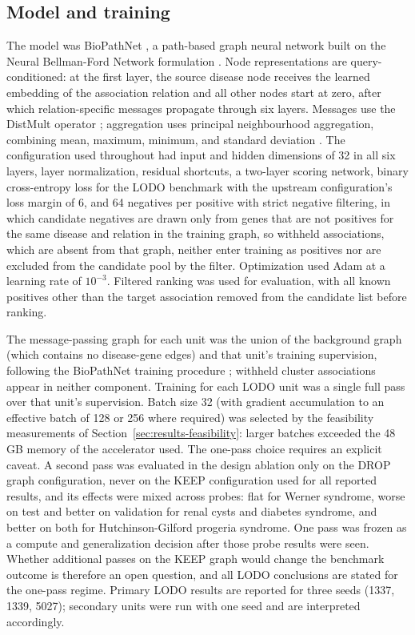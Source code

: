 \documentclass[11pt]{article}
\begin{document}
\subsection{Model and training}

The model was BioPathNet \cite{hu2026}, a path-based graph neural network built on the Neural Bellman-Ford Network formulation \cite{zhu2021}. Node representations are query-conditioned: at the first layer, the source disease node receives the learned embedding of the association relation and all other nodes start at zero, after which relation-specific messages propagate through six layers. Messages use the DistMult operator \cite{yang2015}; aggregation uses principal neighbourhood aggregation, combining mean, maximum, minimum, and standard deviation \cite{corso2020}. The configuration used throughout had input and hidden dimensions of 32 in all six layers, layer normalization, residual shortcuts, a two-layer scoring network, binary cross-entropy loss for the LODO benchmark with the upstream configuration's loss margin of 6, and 64 negatives per positive with strict negative filtering, in which candidate negatives are drawn only from genes that are not positives for the same disease and relation in the training graph, so withheld associations, which are absent from that graph, neither enter training as positives nor are excluded from the candidate pool by the filter. Optimization used Adam \cite{kingma2015} at a learning rate of $10^{-3}$. Filtered ranking was used for evaluation, with all known positives other than the target association removed from the candidate list before ranking.

The message-passing graph for each unit was the union of the background graph (which contains no disease-gene edges) and that unit's training supervision, following the BioPathNet training procedure \cite{hu2026}; withheld cluster associations appear in neither component. Training for each LODO unit was a single full pass over that unit's supervision. Batch size 32 (with gradient accumulation to an effective batch of 128 or 256 where required) was selected by the feasibility measurements of Section~\ref{sec:results-feasibility}: larger batches exceeded the 48 GB memory of the accelerator used. The one-pass choice requires an explicit caveat. A second pass was evaluated in the design ablation only on the DROP graph configuration, never on the KEEP configuration used for all reported results, and its effects were mixed across probes: flat for Werner syndrome, worse on test and better on validation for renal cysts and diabetes syndrome, and better on both for Hutchinson-Gilford progeria syndrome. One pass was frozen as a compute and generalization decision after those probe results were seen. Whether additional passes on the KEEP graph would change the benchmark outcome is therefore an open question, and all LODO conclusions are stated for the one-pass regime. Primary LODO results are reported for three seeds (1337, 1339, 5027); secondary units were run with one seed and are interpreted accordingly.
\end{document}
